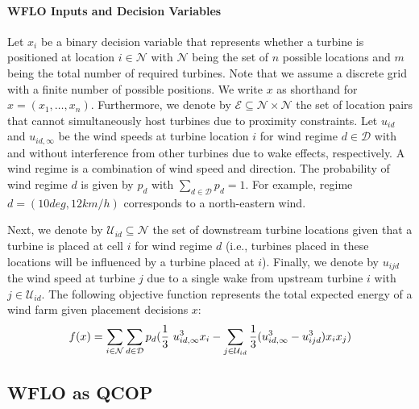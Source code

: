 \documentclass[preprint,12pt]{elsarticle}
\begin{document}
\paragraph{WFLO Inputs and Decision Variables} Let $x_i$ be a binary decision variable that represents whether a 
turbine is positioned at location $i \in \mathcal{N}$ with $\mathcal{N}$ being the set 
of $n$ possible locations and 
$m$ being the total number of required turbines. Note that we assume a discrete grid with 
a finite number of possible positions. We 
write $x$ as shorthand for $x = (x_1,\ldots, x_n)$. Furthermore,
we denote by $\mathcal{E} \subseteq \mathcal{N}\times \mathcal{N}$
the set of location pairs that cannot simultaneously host turbines 
due to proximity constraints. 
Let $u_{id}$ and $u_{id, \infty} $ 
be the wind speeds at turbine location $i$ for wind regime $d \in \mathcal{D}$
with and without interference from other turbines due to wake effects, respectively. A wind regime is a combination 
of wind speed and direction. 
The probability of wind regime 
$d$ is given by $p_d$ with $\sum_{d \in \mathcal{D}}^{} p_d = 1$. For example, 
regime $d=(10deg, 12km/h)$ corresponds to a north-eastern wind.

 
Next, we denote by $\mathcal{U}_{id} \subseteq \mathcal{N}$ 
the set of downstream 
turbine locations 
given that a turbine is placed at cell $i$ for wind regime $d$ (i.e., turbines placed in these locations 
will be influenced by a turbine placed at $i$). Finally,
we denote by $u_{ijd}$ the wind speed at turbine $j$ due to a single wake from upstream turbine $i$ with $j \in \mathcal{U}_{id}$. 
The following objective function  
represents the total expected energy of a wind farm given placement decisions 
$x$: \begin{equation}
f(x) = \sum_{i \in \mathcal{N}}^{} \sum_{d \in \mathcal{D}}^{} p_d ( \frac{1}{3} \ u_{id, \infty}^3 x_i  - \sum_{j \in \mathcal{U}_{id}}^{} \frac{1}{3}(u_{id, \infty} ^3 - u_{ijd}^3)x_i x_j)   \label{ObjFunc}\\
\end{equation} 

\subsection{WFLO as QCOP}
\end{document}

